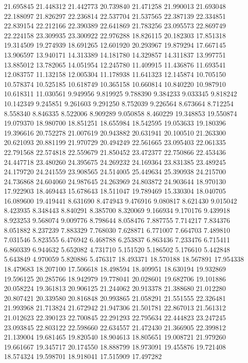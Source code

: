 21.695845
21.448312
21.442773
20.739840
21.471258
21.990013
21.693048
22.188097
21.826297
22.236814
22.537704
21.537565
22.387139
22.334851
22.839154
22.212166
22.390389
22.641869
21.783256
23.095573
22.869749
22.224158
23.309935
23.300922
22.976288
18.826115
20.182303
17.851318
19.314509
19.274939
18.691265
12.601920
20.293967
19.879294
17.667145
13.906597
13.940171
14.313389
14.181780
14.329857
14.311837
13.997751
13.885012
13.782065
14.051954
12.245780
11.409915
11.436876
11.693541
12.083757
11.132158
12.005304
11.178938
11.641323
12.145874
10.705150
10.578374
10.525185
10.618749
10.365158
10.660814
10.840220
10.987910
10.618311
11.030561
9.949956
9.819925
9.788390
9.384233
9.033345
9.818242
10.142349
9.245851
9.261603
9.291250
8.752039
9.226564
8.673664
8.712254
8.558340
8.846335
8.522006
8.909289
9.050858
8.460229
19.348853
19.550874
19.079370
18.980700
18.851251
18.655984
18.542595
19.053633
19.180396
19.396616
20.752278
21.007619
20.943882
20.631941
20.100510
21.263300
20.621093
20.881199
21.970729
20.494249
22.561665
23.095403
22.061335
22.791568
22.574818
22.559679
21.850452
23.472377
22.750866
22.453436
24.447718
23.480260
24.395675
24.269232
24.169364
23.831385
23.489245
24.179720
24.241559
23.908565
24.514005
25.449634
25.390938
24.215700
24.736868
24.604060
24.987645
24.263969
24.803872
24.903644
18.970130
17.922903
18.469443
15.678643
18.511047
19.789469
15.330304
18.040705
16.089600
19.419441
8.631690
8.474943
9.476916
9.080817
8.621430
9.015042
8.423935
8.348443
8.840291
8.385700
8.320069
9.166934
9.170176
9.439918
8.923253
9.568074
9.009776
8.798644
8.058476
7.887755
7.714217
7.834376
8.051882
8.237239
7.883329
7.768030
7.628871
6.771007
7.664703
7.489810
7.031546
5.823555
6.476942
6.468788
6.253837
6.863436
7.233476
6.715411
6.860339
6.944632
5.652082
4.731710
5.151520
5.186502
5.176610
5.442848
5.643849
4.970059
5.820886
5.476317
18.493371
18.570188
18.567891
17.954338
18.479683
18.207100
17.506618
18.498594
18.409951
18.630194
19.932869
19.596125
20.285766
18.942979
19.778041
20.028601
19.682706
19.101886
20.058224
19.361813
20.906125
21.244062
20.913378
21.388680
21.012280
20.807421
20.339580
20.816848
20.993865
21.058291
21.551555
22.326481
21.993968
21.713824
21.672942
21.947306
21.501781
22.867013
21.561312
21.012623
22.390123
22.700845
22.291293
22.795634
22.444823
23.247245
23.093845
22.803122
22.598660
22.634557
21.472430
21.366905
22.399812
21.139004
19.681465
19.820540
18.904613
18.805651
19.008721
21.979260
19.661667
19.345717
20.174550
18.888799
18.973091
19.455876
19.721408
18.574324
19.598701
18.918041
17.515909
17.497282
